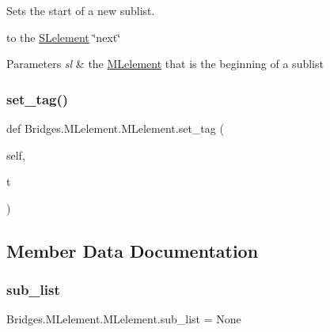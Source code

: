 Sets the start of a new sublist. 

to the \mbox{\hyperlink{namespace_bridges_1_1_s_lelement}{S\+Lelement}} \char`\"{}next\char`\"{}


\begin{DoxyParams}{Parameters}
{\em sl} & the \mbox{\hyperlink{class_bridges_1_1_m_lelement_1_1_m_lelement}{M\+Lelement}} that is the beginning of a sublist \\
\hline
\end{DoxyParams}
\mbox{\label{class_bridges_1_1_m_lelement_1_1_m_lelement_a25d6a2e4524e4427b9f540fc41d44508}} 
\subsubsection{\texorpdfstring{set\+\_\+tag()}{set\_tag()}}
{\footnotesize\ttfamily def Bridges.\+M\+Lelement.\+M\+Lelement.\+set\+\_\+tag (\begin{DoxyParamCaption}\item[{}]{self,  }\item[{}]{t }\end{DoxyParamCaption})}



\subsection{Member Data Documentation}
\mbox{\label{class_bridges_1_1_m_lelement_1_1_m_lelement_ae79f85968687b3c4c72bd56b836d0976}} 
\subsubsection{\texorpdfstring{sub\+\_\+list}{sub\_list}}
{\footnotesize\ttfamily Bridges.\+M\+Lelement.\+M\+Lelement.\+sub\+\_\+list = None\hspace{0.3cm}{\ttfamily [static]}}

